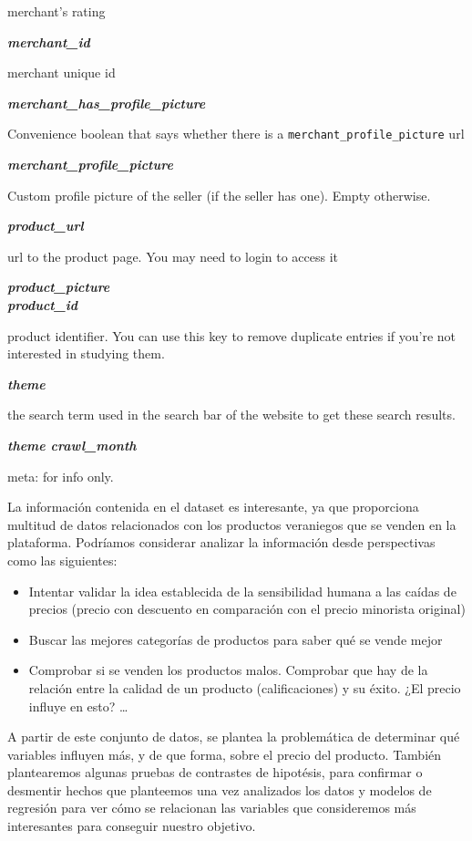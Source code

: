 \documentclass[
]{article}
\providecommand{\tightlist}{%
  \setlength{\itemsep}{0pt}\setlength{\parskip}{0pt}}
\begin{document}
merchant's rating

\textbf{\emph{merchant\_id}}

merchant unique id

\textbf{\emph{merchant\_has\_profile\_picture}}

Convenience boolean that says whether there is a
\texttt{merchant\_profile\_picture} url

\textbf{\emph{merchant\_profile\_picture}}

Custom profile picture of the seller (if the seller has one). Empty
otherwise.

\textbf{\emph{product\_url}}

url to the product page. You may need to login to access it

\textbf{\emph{product\_picture}}\\
\textbf{\emph{product\_id}}

product identifier. You can use this key to remove duplicate entries if
you're not interested in studying them.

\textbf{\emph{theme}}

the search term used in the search bar of the website to get these
search results.

\textbf{\emph{theme crawl\_month}}

meta: for info only.

La información contenida en el dataset es interesante, ya que
proporciona multitud de datos relacionados con los productos veraniegos
que se venden en la plataforma. Podríamos considerar analizar la
información desde perspectivas como las siguientes:

\begin{itemize}
\tightlist
\item
  Intentar validar la idea establecida de la sensibilidad humana a las
  caídas de precios (precio con descuento en comparación con el precio
  minorista original)
\item
  Buscar las mejores categorías de productos para saber qué se vende
  mejor
\item
  Comprobar si se venden los productos malos. Comprobar que hay de la
  relación entre la calidad de un producto (calificaciones) y su éxito.
  ¿El precio influye en esto? \ldots{}
\end{itemize}

A partir de este conjunto de datos, se plantea la problemática de
determinar qué variables influyen más, y de que forma, sobre el precio
del producto. También plantearemos algunas pruebas de contrastes de
hipotésis, para confirmar o desmentir hechos que planteemos una vez
analizados los datos y modelos de regresión para ver cómo se relacionan
las variables que consideremos más interesantes para conseguir nuestro
objetivo.
\end{document}
